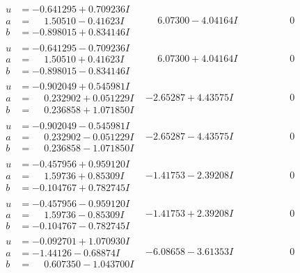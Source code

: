 \documentclass[1p]{elsarticle_modified}
\theoremstyle{definition}
\begin{document}
$$\begin{array}{c|c|c}
\begin{aligned}
u &= -0.641295 + 0.709236 I \\
a &= \phantom{-}1.50510 - 0.41623 I \\
b &= -0.898015 + 0.834146 I\end{aligned}
 & \phantom{-}6.07300 - 4.04164 I & \phantom{-0.000000 } 0 \\ \hline\begin{aligned}
u &= -0.641295 - 0.709236 I \\
a &= \phantom{-}1.50510 + 0.41623 I \\
b &= -0.898015 - 0.834146 I\end{aligned}
 & \phantom{-}6.07300 + 4.04164 I & \phantom{-0.000000 } 0 \\ \hline\begin{aligned}
u &= -0.902049 + 0.545981 I \\
a &= \phantom{-}0.232902 + 0.051229 I \\
b &= \phantom{-}0.236858 + 1.071850 I\end{aligned}
 & -2.65287 + 4.43575 I & \phantom{-0.000000 } 0 \\ \hline\begin{aligned}
u &= -0.902049 - 0.545981 I \\
a &= \phantom{-}0.232902 - 0.051229 I \\
b &= \phantom{-}0.236858 - 1.071850 I\end{aligned}
 & -2.65287 - 4.43575 I & \phantom{-0.000000 } 0 \\ \hline\begin{aligned}
u &= -0.457956 + 0.959120 I \\
a &= \phantom{-}1.59736 + 0.85309 I \\
b &= -0.104767 + 0.782745 I\end{aligned}
 & -1.41753 - 2.39208 I & \phantom{-0.000000 } 0 \\ \hline\begin{aligned}
u &= -0.457956 - 0.959120 I \\
a &= \phantom{-}1.59736 - 0.85309 I \\
b &= -0.104767 - 0.782745 I\end{aligned}
 & -1.41753 + 2.39208 I & \phantom{-0.000000 } 0 \\ \hline\begin{aligned}
u &= -0.092701 + 1.070930 I \\
a &= -1.44126 - 0.68874 I \\
b &= \phantom{-}0.607350 - 1.043700 I\end{aligned}
 & -6.08658 - 3.61353 I & \phantom{-0.000000 } 0 \\ \hline\begin{aligned}

\end{aligned}
\end{array}$$
\end{document}
